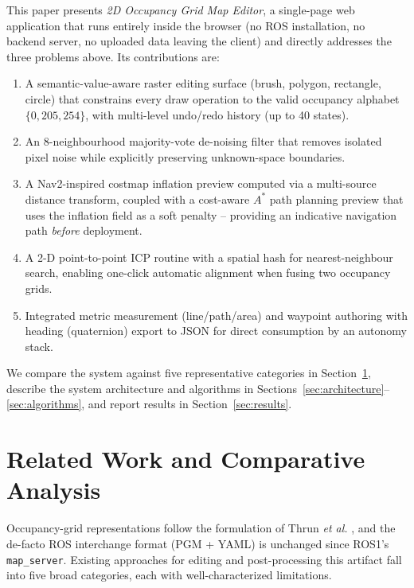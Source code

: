 \documentclass{IEEE_lsens}
\begin{document}
This paper presents \emph{2D Occupancy Grid Map Editor}, a single-page web application that runs entirely inside the browser (no ROS installation, no backend server, no uploaded data leaving the client) and directly addresses the three problems above. Its contributions are:
\begin{enumerate}
  \setlength{\itemsep}{0pt}
  \setlength{\parskip}{0pt}
  \item A semantic-value-aware raster editing surface (brush, polygon, rectangle, circle) that constrains every draw operation to the valid occupancy alphabet $\{0,205,254\}$, with multi-level undo/redo history (up to 40 states).
  \item An 8-neighbourhood majority-vote de-noising filter that removes isolated pixel noise while explicitly preserving unknown-space boundaries.
  \item A Nav2-inspired costmap inflation preview computed via a multi-source distance transform, coupled with a cost-aware $A^{*}$ path planning preview that uses the inflation field as a soft penalty -- providing an indicative navigation path \emph{before} deployment.
  \item A 2-D point-to-point ICP routine with a spatial hash for nearest-neighbour search, enabling one-click automatic alignment when fusing two occupancy grids.
  \item Integrated metric measurement (line/path/area) and waypoint authoring with heading (quaternion) export to JSON for direct consumption by an autonomy stack.
\end{enumerate}
We compare the system against five representative categories in Section~\ref{sec:related}, describe the system architecture and algorithms in Sections~\ref{sec:architecture}--\ref{sec:algorithms}, and report results in Section~\ref{sec:results}.

\section{Related Work and Comparative Analysis}
\label{sec:related}
Occupancy-grid representations follow the formulation of Thrun \emph{et al.} \cite{thrun2005probabilistic}, and the de-facto ROS interchange format (PGM + YAML) is unchanged since ROS1's \texttt{map\_server}. Existing approaches for editing and post-processing this artifact fall into five broad categories, each with well-characterized limitations.
\end{document}
